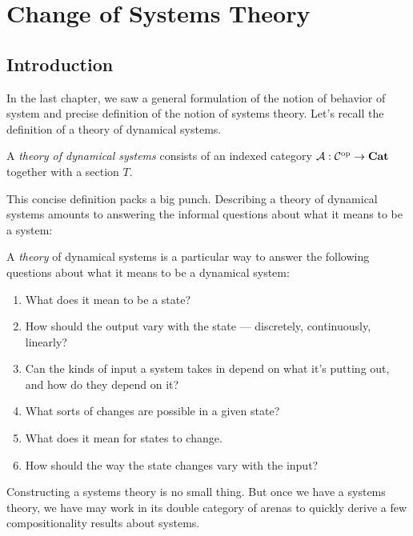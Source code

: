 \documentclass[DynamicalBook]{subfiles}
\begin{document}
%


\setcounter{chapter}{3}%


\chapter{Change of Systems Theory}

\section{Introduction}

In the last chapter, we saw a general formulation of the notion of behavior of
system and precise definition of the notion of systems theory. Let's
recall the definition of a theory of dynamical systems.

\begin{definition}\label{def.doctrine}
A \emph{theory of dynamical systems} consists of an indexed category $\mathcal{A} :
\mathcal{C}^{\textnormal{op}} \to \textbf{Cat}$ together with a section $T$.
\end{definition}

This concise definition packs a big punch. Describing a theory of dynamical systems amounts to answering the informal questions about what it means to be a
system:
\begin{informal}
  A \emph{theory} of dynamical systems is a particular way to answer the following
  questions about what it means to be a dynamical system:
  \begin{enumerate}
  \item What does it mean to be a state?
  \item How should the output vary with the state --- discretely,
    continuously, linearly?
  \item Can the kinds of input a
    system takes in depend on what it's putting out, and how do they depend on it?
  \item What sorts of changes are possible in a given state?
  \item What does it mean for states to change. 
  \item How should the way the state changes vary with the input?
  \end{enumerate}
\end{informal}

Constructing a systems theory is no small thing. But once we have a systems theory, we have
may work in its double category of arenas to quickly derive a few
compositionality results about systems.
\end{document}
